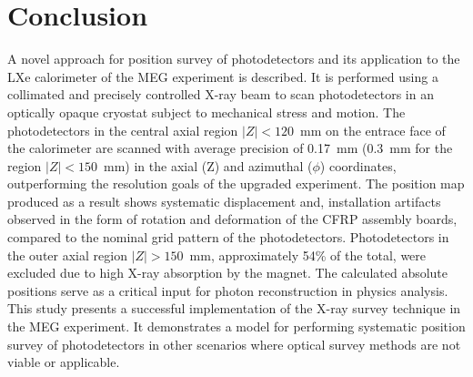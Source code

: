 \section{\label{conclusion}Conclusion}
A novel approach for position survey of photodetectors and its
application to the LXe calorimeter of the MEG experiment is described.
It is performed using a collimated and precisely controlled X-ray beam
to scan photodetectors in an optically opaque cryostat subject to
mechanical stress and motion.  The photodetectors in the central axial
region $|Z|<120$~mm on the entrace face of the calorimeter are scanned
with average precision of 0.17~mm (0.3~mm for the region $|Z|<150$~mm)
in the axial (Z) and azimuthal ($\phi$) coordinates, outperforming the
resolution goals of the upgraded experiment.  The position map
produced as a result shows systematic displacement and, installation
artifacts observed in the form of rotation and deformation of the CFRP
assembly boards, compared to the nominal grid pattern of the
photodetectors.  Photodetectors in the outer axial region
$|Z|>150$~mm, approximately 54\% of the total, were excluded due to
high X-ray absorption by the magnet.  The calculated absolute
positions serve as a critical input for photon reconstruction in
physics analysis.  This study presents a successful implementation of
the X-ray survey technique in the MEG experiment. It demonstrates a
model for performing systematic position survey of photodetectors in
other scenarios where optical survey methods are not viable or
applicable.
